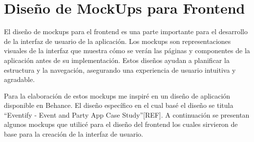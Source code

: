 \section{Diseño de MockUps para Frontend}

El diseño de mockups para el frontend es una parte importante para el desarrollo de la interfaz de usuario de la aplicación. Los mockups son representaciones visuales de la interfaz que muestra cómo se verán las páginas y componentes de la aplicación antes de su implementación. Estos diseños ayudan a planificar la estructura y la navegación, asegurando una experiencia de usuario intuitiva y agradable. 

Para la elaboración de estos mockups me inspiré en un diseño de aplicación disponible en Behance. El diseño específico en el cual basé el diseño se titula “Eventify - Event and Party App Case Study”[REF]. A continuación se presentan algunos mockups que utilicé para el diseño del frontend los cuales sirvieron de base para la creación de la interfaz de usuario.

